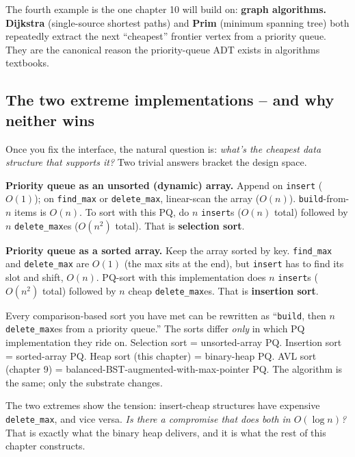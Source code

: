 \documentclass[11pt]{article}
\begin{document}
The fourth example is the one chapter 10 will build on: \textbf{graph
algorithms.} \textbf{Dijkstra} (single-source shortest paths) and
\textbf{Prim} (minimum spanning tree) both repeatedly extract the next
``cheapest'' frontier vertex from a priority queue. They are the
canonical reason the priority-queue ADT exists in algorithms textbooks.

\subsection*{The two extreme implementations -- and why neither wins}

Once you fix the interface, the natural question is: \emph{what's the
cheapest data structure that supports it?} Two trivial answers bracket
the design space.

\textbf{Priority queue as an unsorted (dynamic) array.} Append on
\texttt{insert} ($O(1)$); on \texttt{find\_max} or \texttt{delete\_max},
linear-scan the array ($O(n)$). \texttt{build}-from-$n$ items is
$O(n)$. To sort with this PQ, do $n$ \texttt{insert}s ($O(n)$ total)
followed by $n$ \texttt{delete\_max}es ($O(n^2)$ total). That is
\textbf{selection sort}.

\textbf{Priority queue as a sorted array.} Keep the array sorted by
key. \texttt{find\_max} and \texttt{delete\_max} are $O(1)$ (the max
sits at the end), but \texttt{insert} has to find its slot and shift,
$O(n)$. PQ-sort with this implementation does $n$ \texttt{insert}s
($O(n^2)$ total) followed by $n$ cheap \texttt{delete\_max}es. That is
\textbf{insertion sort}.

\begin{ideabox}
Every comparison-based sort you have met can be rewritten as
``\texttt{build}, then $n$ \texttt{delete\_max}es from a priority
queue.'' The sorts differ \emph{only} in which PQ implementation they
ride on. Selection sort = unsorted-array PQ. Insertion sort =
sorted-array PQ. Heap sort (this chapter) = binary-heap PQ. AVL sort
(chapter 9) = balanced-BST-augmented-with-max-pointer PQ. The
algorithm is the same; only the substrate changes.
\end{ideabox}

The two extremes show the tension: insert-cheap structures have
expensive \texttt{delete\_max}, and vice versa. \emph{Is there a
compromise that does both in $O(\log n)$?} That is exactly what the
binary heap delivers, and it is what the rest of this chapter
constructs.
\end{document}
